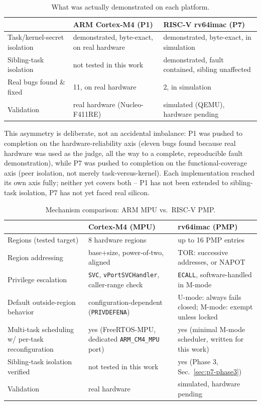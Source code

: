 \documentclass[sigconf,nonacm]{acmart}
\begin{document}
\begin{table}[t]
\caption{What was actually demonstrated on each platform.}
\label{tab:results}
\begin{tabular}{p{2.3cm}p{2.5cm}p{2.5cm}}
\toprule
 & \textbf{ARM Cortex-M4 (P1)} & \textbf{RISC-V rv64imac (P7)} \\
\midrule
Task/kernel-secret isolation & demonstrated, byte-exact, on real hardware & demonstrated, byte-exact, in simulation \\
Sibling-task isolation & not tested in this work & demonstrated, fault contained, sibling unaffected \\
Real bugs found \& fixed & 11, on real hardware & 2, in simulation \\
Validation & real hardware (Nucleo-F411RE) & simulated (QEMU), hardware pending \\
\bottomrule
\end{tabular}
\end{table}

This asymmetry is deliberate, not an accidental imbalance: P1 was pushed to completion on the hardware-reliability axis (eleven bugs found because real hardware was used as the judge, all the way to a complete, reproducible fault demonstration), while P7 was pushed to completion on the functional-coverage axis (peer isolation, not merely task-versus-kernel). Each implementation reached its own axis fully; neither yet covers both -- P1 has not been extended to sibling-task isolation, P7 has not yet faced real silicon.

\begin{table}[t]
\caption{Mechanism comparison: ARM MPU vs.\ RISC-V PMP.}
\label{tab:mechanism}
\begin{tabular}{p{2.6cm}p{2.2cm}p{2.4cm}}
\toprule
 & \textbf{Cortex-M4 (MPU)} & \textbf{rv64imac (PMP)} \\
\midrule
Regions (tested target) & 8 hardware regions & up to 16 PMP entries \\
Region addressing & base+size, power-of-two, aligned & TOR: successive addresses, or NAPOT \\
Privilege escalation & \texttt{SVC}, \texttt{vPortSVCHandler}, caller-range check & \texttt{ECALL}, software-handled in M-mode \\
Default outside-region behavior & configuration-dependent (\texttt{PRIVDEFENA}) & U-mode: always fails closed; M-mode: exempt unless locked \\
Multi-task scheduling w/ per-task reconfiguration & yes (FreeRTOS-MPU, dedicated \texttt{ARM\_CM4\_MPU} port) & yes (minimal M-mode scheduler, written for this work) \\
Sibling-task isolation verified & not tested in this work & yes (Phase 3, Sec.~\ref{sec:p7-phase3}) \\
Validation & real hardware & simulated, hardware pending \\
\bottomrule
\end{tabular}
\end{table}
\end{document}
